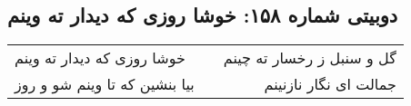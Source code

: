 \begin{center}
\section*{دوبیتی شماره ۱۵۸: خوشا روزی که دیدار ته وینم}
\label{sec:158}
\begin{longtable}{l p{0.5cm} r}
خوشا روزی که دیدار ته وینم
&&
گل و سنبل ز رخسار ته چینم
\\
بیا بنشین که تا وینم شو و روز
&&
جمالت ای نگار نازنینم
\\
\end{longtable}
\end{center}
